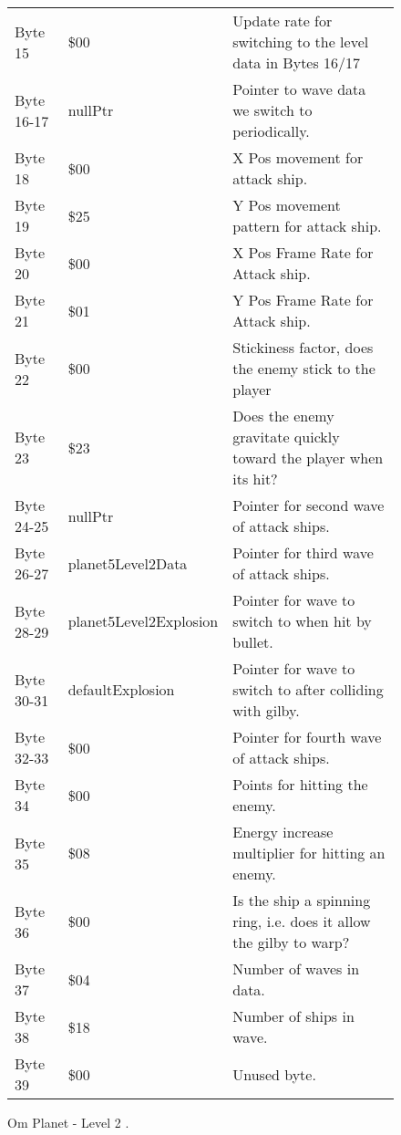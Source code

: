 \begin{figure}[H]
{\begin{adjustbox}{width=12cm}
\begin{tabular}{lll}
 Byte 15    & \$00                    & Update rate for switching to the level data in Bytes 16/17          \\
 Byte 16-17 & nullPtr                & Pointer to wave data we switch to periodically.                     \\
 Byte 18    & \$00                    & X Pos movement for attack ship.                                     \\
 Byte 19    & \$25                    & Y Pos movement pattern for attack ship.                             \\
 Byte 20    & \$00                    & X Pos Frame Rate for Attack ship.                                   \\
 Byte 21    & \$01                    & Y Pos Frame Rate for Attack ship.                                   \\
 Byte 22    & \$00                    & Stickiness factor, does the enemy stick to the player               \\
 Byte 23    & \$23                    & Does the enemy gravitate quickly toward the player when its hit?    \\
 Byte 24-25 & nullPtr                & Pointer for second wave of attack ships.                            \\
 Byte 26-27 & planet5Level2Data      & Pointer for third wave of attack ships.                             \\
 Byte 28-29 & planet5Level2Explosion & Pointer for wave to switch to when hit by bullet.                   \\
 Byte 30-31 & defaultExplosion       & Pointer for  wave to switch to after colliding with gilby.          \\
 Byte 32-33 & \$00                    & Pointer for fourth wave of attack ships.                            \\
 Byte 34    & \$00                    & Points for hitting the enemy.                                       \\
 Byte 35    & \$08                    & Energy increase multiplier for hitting an enemy.                    \\
 Byte 36    & \$00                    & Is the ship a spinning ring, i.e. does it allow the gilby to warp?  \\
 Byte 37    & \$04                    & Number of waves in data.                                            \\
 Byte 38    & \$18                    & Number of ships in wave.                                            \\
 Byte 39    & \$00                    & Unused byte.                                                        \\
\bottomrule
\end{tabular}

  \end{adjustbox}

  }\caption*{Om Planet - Level 2
.}
\end{figure}

